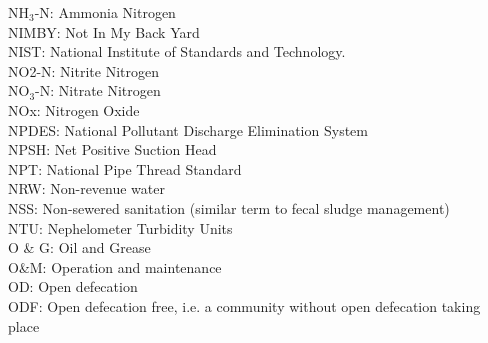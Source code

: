 NH$_3$-N:  Ammonia Nitrogen
\vspace{0.3cm}\\
NIMBY:  Not In My Back Yard
\vspace{0.3cm}\\
NIST:  National Institute of Standards and Technology.
\vspace{0.3cm}\\
NO2-N:  Nitrite Nitrogen 
\vspace{0.3cm}\\
NO$_3$-N:  Nitrate Nitrogen
\vspace{0.3cm}\\
NOx:  Nitrogen Oxide
\vspace{0.3cm}\\
NPDES:  National Pollutant Discharge Elimination System
\vspace{0.3cm}\\
NPSH:  Net Positive Suction Head
\vspace{0.3cm}\\
NPT:  National Pipe Thread Standard
\vspace{0.3cm}\\

NRW:  Non-revenue water
\vspace{0.3cm}\\
NSS:  Non-sewered sanitation (similar term to fecal sludge management)
\vspace{0.3cm}\\
NTU:  Nephelometer Turbidity Units
\vspace{0.3cm}\\
O \& G:  Oil and Grease
\vspace{0.3cm}\\
O\&M:  Operation and maintenance
\vspace{0.3cm}\\
OD:  Open defecation
\vspace{0.3cm}\\
ODF:  Open defecation free, i.e. a community without open defecation taking place
\vspace{0.3cm}\\

